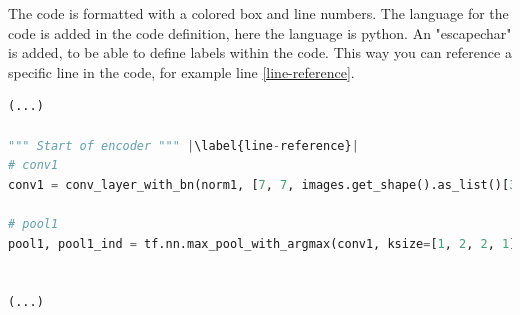 The code is formatted with a colored box and line numbers. The language for the code is added in the code definition, here the language is python. An "escapechar" is added, to be able to define labels within the code. This way you can reference a specific line in the code, for example line \ref{line-reference}.

\begin{lstlisting}[language=Python, escapechar=| , caption = {[Short description for list of code] Caption text}, label={code:code-example}]
(...)

""" Start of encoder """ |\label{line-reference}|
# conv1
conv1 = conv_layer_with_bn(norm1, [7, 7, images.get_shape().as_list()[3], 64], phase_train, name="conv1")

# pool1
pool1, pool1_ind = tf.nn.max_pool_with_argmax(conv1, ksize=[1, 2, 2, 1], strides=[1, 2, 2, 1], padding='SAME', name='pool1')


(...)
\end{lstlisting}
